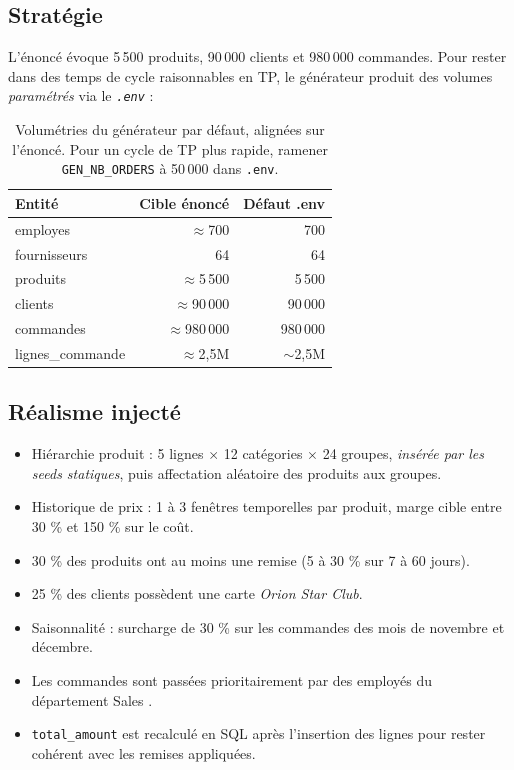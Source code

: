 \documentclass[11pt,a4paper]{article}
\newcommand{\code}[1]{\texttt{\small #1}}
\newcommand{\file}[1]{\texttt{\small\itshape #1}}
\begin{document}
\subsection{Stratégie}

L'énoncé évoque 5\,500 produits, 90\,000 clients et 980\,000 commandes.
Pour rester dans des temps de cycle raisonnables en TP, le générateur
produit des volumes \emph{paramétrés} via le \file{.env} :

\begin{table}[h]
\centering\small
\begin{tabular}{lrr}\toprule
\textbf{Entité}    & \textbf{Cible énoncé} & \textbf{Défaut .env}\\\midrule
employes           &      $\approx$700      &       700\\
fournisseurs       &           64           &        64\\
produits           &      $\approx$5\,500    &     5\,500\\
clients            &      $\approx$90\,000   &    90\,000\\
commandes          &      $\approx$980\,000  &   980\,000\\
lignes\_commande   &      $\approx$2,5M     &  $\sim$2,5M\\
\bottomrule
\end{tabular}
\caption{Volumétries du générateur par défaut, alignées sur l'énoncé. Pour un cycle de TP plus rapide, ramener \texttt{GEN\_NB\_ORDERS} à 50\,000 dans \texttt{.env}.}
\end{table}

\subsection{Réalisme injecté}

\begin{itemize}
  \item Hiérarchie produit : 5 lignes $\times$ 12 catégories $\times$ 24 groupes,
    \emph{insérée par les seeds statiques}, puis affectation aléatoire des
    produits aux groupes.
  \item Historique de prix : 1 à 3 fenêtres temporelles par produit, marge
    cible entre 30 \% et 150 \% sur le coût.
  \item 30 \% des produits ont au moins une remise (5 à 30 \% sur 7 à 60 jours).
  \item 25 \% des clients possèdent une carte \emph{Orion Star Club}.
  \item Saisonnalité : surcharge de 30 \% sur les commandes des mois de
    novembre et décembre.
  \item Les commandes sont passées prioritairement par des employés du
    département \og Sales \fg{}.
  \item \code{total\_amount} est recalculé en SQL après l'insertion des lignes
    pour rester cohérent avec les remises appliquées.
\end{itemize}
\end{document}
